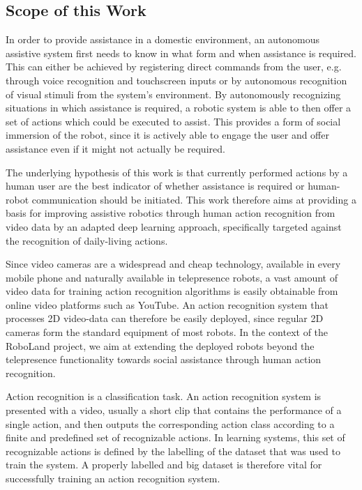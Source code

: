 \subsection{Scope of this Work}
In order to provide assistance in a domestic environment, an autonomous assistive system first needs to know in what form and when assistance is required.
This can either be achieved by registering direct commands from the user, e.g. through voice recognition and touchscreen inputs or by autonomous recognition of visual stimuli from the system's environment.
By autonomously recognizing situations in which assistance is required, a robotic system is able to then offer a set of actions which could be executed to assist.
This provides a form of social immersion of the robot, since it is actively able to engage the user and offer assistance even if it might not actually be required. 

The underlying hypothesis of this work is that currently performed actions by a human user are the best indicator of whether assistance is required or human-robot communication should be initiated.
This work therefore aims at providing a basis for improving assistive robotics through human action recognition from video data by an adapted deep learning approach, specifically targeted against the recognition of daily-living actions.

Since video cameras are a widespread and cheap technology, available in every mobile phone and naturally available in telepresence robots, a vast amount of video data for training action recognition algorithms is easily obtainable from online video platforms such as YouTube.
An action recognition system that processes 2D video-data can therefore be easily deployed, since regular 2D cameras form the standard equipment of most robots.
In the context of the RoboLand project, we aim at extending the deployed robots beyond the telepresence functionality towards social assistance through human action recognition.

Action recognition is a classification task.
An action recognition system is presented with a video, usually a short clip that contains the performance of a single action, and then outputs the corresponding action class according to a finite and predefined set of recognizable actions.
In learning systems, this set of recognizable actions is defined by the labelling of the dataset that was used to train the system.
A properly labelled and big dataset is therefore vital for successfully training an action recognition system.


